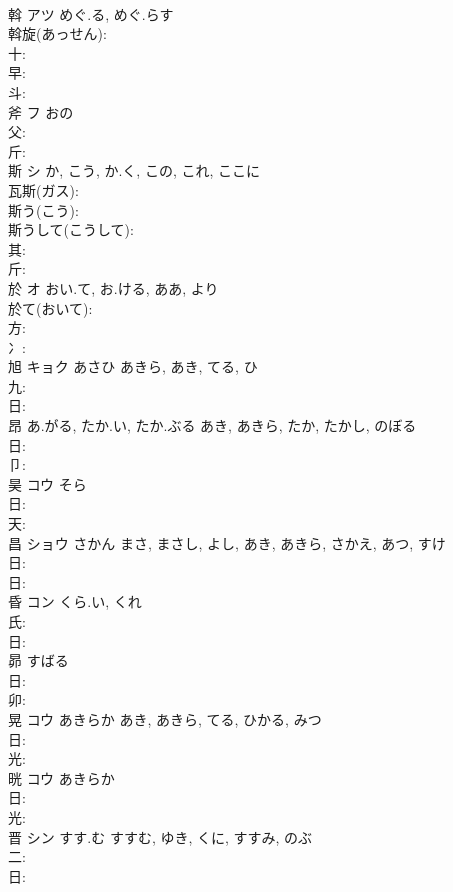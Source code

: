 \documentclass[8pt]{extreport}
\begin{document}
\begin{CJK}{UTF8}{min}
\\	斡	アツ	めぐ.る, めぐ.らす		
\\	斡旋(あっせん): 
\\	十: 
\\	早: 
\\	斗: 
\\	斧	フ	おの		
\\	父: 
\\	斤: 
\\	斯	シ	か, こう, か.く, この, これ, ここに		
\\	瓦斯(ガス): 
\\	斯う(こう): 
\\	斯うして(こうして): 
\\	其: 
\\	斤: 
\\	於	オ	おい.て, お.ける, ああ, より		
\\	於て(おいて): 
\\	方: 
\\	冫: 
\\	旭	キョク	あさひ	あきら, あき, てる, ひ	
\\	九: 
\\	日: 
\\	昂		あ.がる, たか.い, たか.ぶる	あき, あきら, たか, たかし, のぼる		
\\	日: 
\\	卩: 
\\	昊	コウ	そら		
\\	日: 
\\	天: 
\\	昌	ショウ	さかん	まさ, まさし, よし, あき, あきら, さかえ, あつ, すけ	
\\	日: 
\\	日: 
\\	昏	コン	くら.い, くれ		
\\	氏: 
\\	日: 
\\	昴		すばる			
\\	日: 
\\	卯: 
\\	晃	コウ	あきらか	あき, あきら, てる, ひかる, みつ	
\\	日: 
\\	光: 
\\	晄	コウ	あきらか		
\\	日: 
\\	光: 
\\	晋	シン	すす.む	すすむ, ゆき, くに, すすみ, のぶ	
\\	二: 
\\	日: 

\end{CJK}
\end{document}
